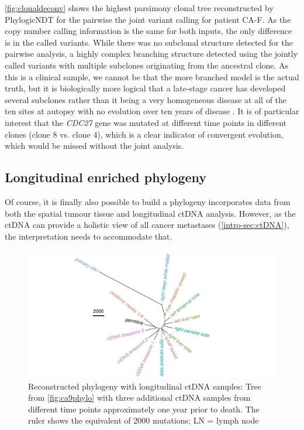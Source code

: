 \autoref{fig:clonaldeconv} shows the highest parsimony clonal tree reconstructed by PhylogicNDT for the pairwise  the joint variant calling for patient CA-F. As the copy number calling information is the same for both inputs, the only difference is in the called variants. While there was no subclonal structure detected  for the pairwise analysis,  a highly complex branching structure  detected using the jointly called variants with multiple subclones originating from the ancestral clone. As this is a clinical sample, we cannot be  that the more branched model is the actual truth, but it is biologically more logical that a late-stage cancer has developed several subclones rather than it being a very homogeneous disease at all of the ten sites at autopsy with no evolution over ten years of disease \cite{Gerstung2020}.
It is of particular interest that the \textit{CDC27} gene was mutated at different time points in different clones (clone 8 vs. clone 4), which is a clear indicator of convergent evolution, which would  be missed without the joint analysis.


\subsection{Longitudinal enriched phylogeny}
\label{variantcalling-sec:fullphylo}
Of course, it is finally also possible to build a phylogeny  incorporates data from both the spatial tumour tissue and longitudinal ctDNA analysis. However, as the ctDNA can provide a holistic view of all cancer metastases (\autoref{intro-sec:ctDNA}), the interpretation needs to accommodate  that. 

\begin{figure}[ht]
\centering
\includegraphics[width=.99\linewidth]{Figures/jointVariantCalling/phyloCA9_withctDNA.pdf}
\caption[Reconstructed phylogeny with longitudinal ctDNA samples]{Reconstructed phylogeny with longitudinal ctDNA samples: Tree from \autoref{fig:ca9phylo} with three additional ctDNA samples from different time points approximately one year prior to death. The ruler shows the equivalent of 2000 mutations; LN = lymph node} \label{fig:phyloCA9ctDNA}
\end{figure}


